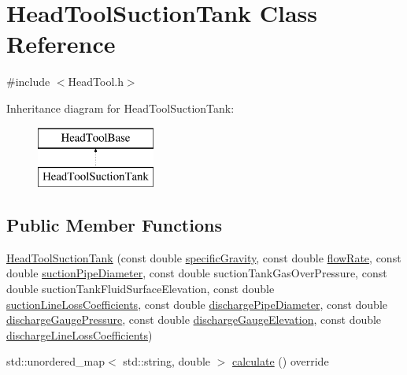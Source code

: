 \hypertarget{class_head_tool_suction_tank}{}\section{Head\+Tool\+Suction\+Tank Class Reference}
\label{class_head_tool_suction_tank}


{\ttfamily \#include $<$Head\+Tool.\+h$>$}

Inheritance diagram for Head\+Tool\+Suction\+Tank\+:\begin{figure}[H]
\begin{center}
\leavevmode
\includegraphics[height=2.000000cm]{d8/dec/class_head_tool_suction_tank}
\end{center}
\end{figure}
\subsection*{Public Member Functions}
\begin{DoxyCompactItemize}
\item 
\hyperlink{class_head_tool_suction_tank_a96579ecd414c723362db00cfeb24cd46}{Head\+Tool\+Suction\+Tank} (const double \hyperlink{class_head_tool_base_ae5af2380fb5db2c25281ef663a5fb65f}{specific\+Gravity}, const double \hyperlink{class_head_tool_base_acf4c03cb62cbf63aba017ce063989fbc}{flow\+Rate}, const double \hyperlink{class_head_tool_base_a357365fc5ef346ce7bcb089c9d1a95e1}{suction\+Pipe\+Diameter}, const double suction\+Tank\+Gas\+Over\+Pressure, const double suction\+Tank\+Fluid\+Surface\+Elevation, const double \hyperlink{class_head_tool_base_ac74c6f6f8ab387efe7b77e0ce6ecd84e}{suction\+Line\+Loss\+Coefficients}, const double \hyperlink{class_head_tool_base_a126a397bd3d87b68864e1962c70bb45e}{discharge\+Pipe\+Diameter}, const double \hyperlink{class_head_tool_base_a39c854f13b16967e02a67cd1aaee07c4}{discharge\+Gauge\+Pressure}, const double \hyperlink{class_head_tool_base_a9ed2160992f8da2e335d919cf9aedd08}{discharge\+Gauge\+Elevation}, const double \hyperlink{class_head_tool_base_a147c035c7422406c594c5fd42ab11eb0}{discharge\+Line\+Loss\+Coefficients})
\item 
std\+::unordered\+\_\+map$<$ std\+::string, double $>$ \hyperlink{class_head_tool_suction_tank_a390a38466222aa3b87d2cf2ec84537a5}{calculate} () override
\end{DoxyCompactItemize}


